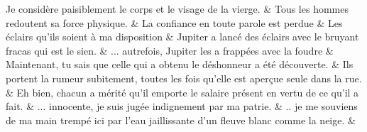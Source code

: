 \documentclass[12pt,onecolumn,twoside,a4paper]{memoir}
\begin{document}
\begin{pairs}
\begin{Leftside}
                  \endnumbering
		\end{Leftside}
                  \begin{Rightside}
			\beginnumbering
			\numberstanzafalse
                     
                         \stanza 
                     Je considère paisiblement le corps et le visage de la vierge. \&
                         \stanza 
                     Tous les hommes redoutent sa force physique. \&
                         \stanza 
                     La confiance en toute parole est perdue  \&
                         \stanza 
                     Les éclairs qu’ils soient à ma disposition \&
                         \stanza 
                     Jupiter a lancé des éclairs avec le bruyant fracas qui est le
                              sien. \&
                         \stanza 
                     ... autrefois, Jupiter les a frappées avec la foudre \&
                         \stanza 
                     Maintenant, tu sais que celle qui a obtenu le déshonneur a été
                              découverte. \&
                         \stanza 
                     Ils portent la rumeur subitement, toutes les fois qu’elle est aperçue
                              seule dans la rue. \&
                         \stanza 
                     Eh bien, chacun a mérité qu'il emporte le salaire présent en vertu de
                              ce qu'il a fait. \&
                         \stanza 
                     ... innocente, je suis jugée indignement par ma patrie. \&
                         \stanza 
                     .. je me souviens de ma main trempé ici par l'eau jaillissante d'un
                              fleuve blanc comme la neige. \&
                     
                  \endnumbering
		\end{Rightside}
               \end{pairs}
	\Columns
            
            
\end{document}
